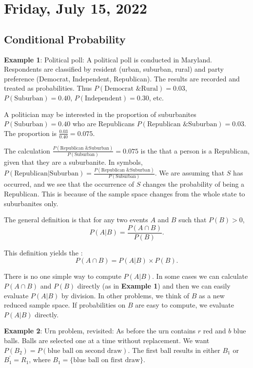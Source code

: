 \section{Friday, July 15, 2022}

\subsection{Conditional Probability}
\textbf{Example 1}: Political poll: A political poll is conducted in Maryland. Respondents are classified by resident (urban, suburban, rural) and party preference (Democrat, Independent, Republican). The results are recorded and treated as probabilities. Thus $P(\text{Democrat \& Rural}) = 0.03$, $P(\text{Suburban}) = 0.40$, $P(\text{Independent}) = 0.30$, etc.

A politician may be interested in the proportion of suburbanites $P(\text{Suburban}) = 0.40$ who are Republicans $P(\text{Republican \& Suburban}) = 0.03$. The proportion is $\frac{0.03}{0.40} = 0.075$.

The calculation $\frac{P(\text{Republican \& Suburban})}{P(\text{Suburban})} = 0.075$ is the  that a person is a Republican, given that they are a suburbanite. In symbols, $P(\text{Republican}|\text{Suburban}) = \frac{P(\text{Republican \& Suburban})}{P(\text{Suburban})}$. We are assuming that $S$ has occurred, and we see that the occurrence of $S$ changes the probability of being a Republican. This is because of the sample space changes from the whole state to suburbanites only.

The general definition is that for any two events $A$ and $B$ such that $P(B)>0$, $$P(A|B) = \frac{P(A \cap B)}{P(B)}.$$

This definition yields the : $$P(A \cap B) = P(A|B) \times P(B).$$

There is no one simple way to compute $P(A|B)$. In some cases we can calculate $P(A \cap B)$ and $P(B)$ directly (as in \textbf{Example 1}) and then we can easily evaluate $P(A|B)$ by division. In other problems, we think of $B$ as a new reduced sample space. If probabilities on $B$ are easy to compute, we evaluate $P(A|B)$ directly.

\textbf{Example 2}: Urn problem, revisited: As before the urn contains $r$ red and $b$ blue balls. Balls are selected one at a time without replacement. We want $P(B_{2}) = P(\text{blue ball on second draw})$. The first ball results in either $B_{1}$ or $B^\mathsf{'}_1 = R_{1}$, where $B_{1} = \{\text{blue ball on first draw}\}$.


